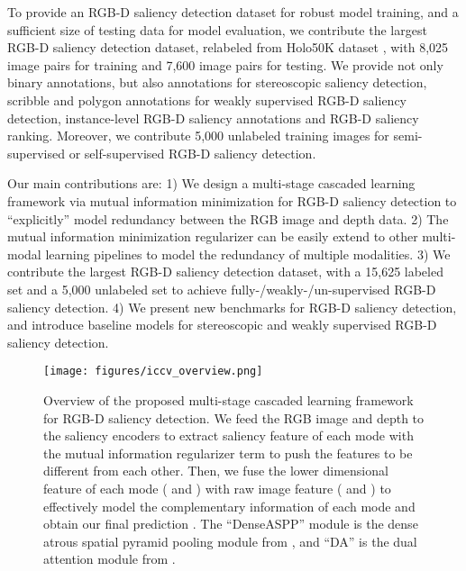 \documentclass[10pt,twocolumn,letterpaper]{article}
\begin{document}
To provide an RGB-D saliency detection dataset for robust model training, and a sufficient size of
testing data for model evaluation, we contribute the largest
RGB-D saliency detection dataset, relabeled from Holo50K dataset \cite{hua2020holopix50k}, with 8,025 image pairs for training and 7,600 image pairs for testing. We provide not only binary annotations, but also
annotations for stereoscopic saliency detection, scribble and polygon annotations for weakly supervised RGB-D saliency detection, instance-level RGB-D saliency annotations and RGB-D saliency ranking.
Moreover, we contribute 5,000 unlabeled training images for semi-supervised or self-supervised RGB-D saliency detection.

Our main contributions are: 1)
We design a multi-stage cascaded learning framework via mutual information minimization for
RGB-D saliency detection
to \enquote{explicitly} model redundancy between the
RGB image and 
depth data.
    2) The mutual information minimization regularizer can be easily extend to other multi-modal learning pipelines to model the redundancy of multiple modalities.
3) We contribute the largest RGB-D saliency detection dataset, with a 15,625 labeled set and a 5,000 unlabeled set to achieve
fully-/weakly-/un-supervised RGB-D saliency detection.
4) We present new benchmarks for RGB-D saliency detection, and introduce baseline models for stereoscopic and weakly supervised RGB-D saliency detection.

\begin{figure*}[tbp]
\centering
\texttt{[image: figures/iccv\_overview.png]}
\vspace{-5pt}
   \caption{Overview of the proposed multi-stage cascaded learning framework for RGB-D saliency detection.
We feed the RGB image and depth to the saliency encoders to extract saliency feature of each mode
with the mutual information regularizer term to push the features to be different from each other. Then, we fuse the lower dimensional feature of each mode ( and ) with raw image feature ( and ) to effectively model the complementary information of each mode and obtain our final prediction . The \enquote{DenseASPP} module is the dense atrous spatial pyramid pooling module from \cite{denseaspp}, and \enquote{DA} is the dual attention module from \cite{fu2019dual}.
}
   \label{fig:network_overview}
\end{figure*}
\end{document}
